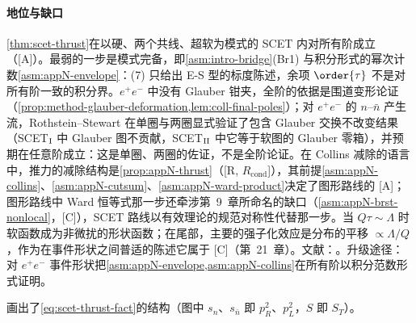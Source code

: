 \paragraph{地位与缺口}
\cref{thm:scet-thrust}在以硬、两个共线、超软为模式的 SCET 内对所有阶成立（[A]）。最弱的一步是模式完备，即\cref{asm:intro-bridge}(Br1) 与积分形式的幂次计数\cref{asm:appN-envelope}：(7) 只给出 E-S 型的标度陈述，余项 $\order{\tau}$ 不是对所有阶一致的积分界。$e^+e^-$ 中没有 Glauber 钳夹，全阶的依据是围道变形论证（\cref{prop:method-glauber-deformation,lem:coll-final-poles}）；对 $e^+e^-$ 的 $n$–$\bar n$ 产生流，Rothstein--Stewart 在单圈与两圈显式验证了包含 Glauber 交换不改变结果（SCET$_{\rm I}$ 中 Glauber 图不贡献，SCET$_{\rm II}$ 中它等于软图的 Glauber 零箱），并预期在任意阶成立\cite[第~10.1、10.3~节]{RothsteinStewart2016}：这是单圈、两圈的佐证，不是全阶论证。在 Collins 减除的语言中，推力的减除结构是\cref{prop:appN-thrust}（[R, $R_{\mathrm{cond}}$]），其前提\cref{asm:appN-collins}、\cref{asm:appN-cutsum}、\cref{asm:appN-ward-product}决定了图形路线的 [A]；图形路线中 Ward 恒等式那一步还牵涉第~9~章所命名的缺口（\cref{asm:appN-brst-nonlocal}，[C]），SCET 路线以有效理论的规范对称性代替那一步。当 $Q\tau\sim\Lambda$ 时软函数成为非微扰的形状函数\cite{Korchemsky:1994is,Korchemsky:1999kt,Bauer:2003di}；在尾部，主要的强子化效应是分布的平移 $\propto\Lambda/Q$，作为在事件形状之间普适的陈述它属于 [C]（第~21~章）。文献：\cite{Bauer:2003di,Lee:2006nr,Fleming:2007qr,Schwartz:2007ib,Fleming:2007xt,BecherSchwartz2008,Bauer:2008dt}。升级途径：对 $e^+e^-$ 事件形状把\cref{asm:appN-envelope,asm:appN-collins}在所有阶以积分范数形式证明。

画出了\cref{eq:scet-thrust-fact}的结构（图中 $s_n$、$s_{\bar n}$ 即 $p_R^2$、$p_L^2$，$S$ 即 $S_T$）。

